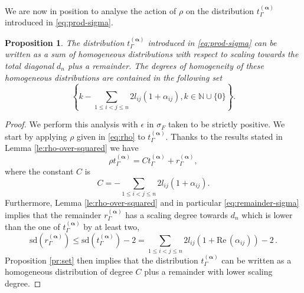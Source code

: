 \documentclass[a4paper,10pt,twoside]{article}
\numberwithin{equation}{section}
\newcounter{and}
\def\Ree{\mathrm{Re}\,}
\def\sd{\mathrm{sd}}
\def\balpha{{\boldsymbol{\alpha}}}
\theoremstyle{plain}
\newtheorem{propo}[theo]{Proposition}
\theoremstyle{definition}
\begin{document}
We are now in position to analyse the action of $\rho$ on the distribution $t_\Gamma^{(\balpha)}$ introduced in \eqref{eq:prod-sigma}.

\begin{propo}\label{pr:almost-homo}
The distribution $t_\Gamma^{(\balpha)}$ introduced in \eqref{eq:prod-sigma} can be written as a sum of homogeneous distributions with respect to scaling towards the total diagonal $d_n$ plus a remainder. The degrees of homogeneity of these homogeneous distributions are contained in the following set
\[
\left\{k-\sum_{1\leq i<j\leq n} 2 l_{ij}(1+ \alpha_{ij}), k\in \mathbb{N}\cup \{0\} \right\}.
\] 
\end{propo}

\begin{proof}
We perform this analysis with $\epsilon$ in $\sigma_F$ taken to be strictly positive. We start by applying $\rho$ given in \eqref{eq:rho} to $t_\Gamma^{(\balpha)}$. Thanks to the results stated in Lemma \ref{le:rho-over-squared} we have
\[
\rho t_\Gamma^{(\balpha)}  =    C   t_\Gamma^{(\balpha)}    + r^{(\balpha)}_\Gamma,
\]
where the constant $C$ is
\[
C= -\sum_{1\leq i<j\leq n} 2 l_{ij}(1+ \alpha_{ij}).
\]
Furthermore, Lemma \ref{le:rho-over-squared} and in particular \eqref{eq:remainder-sigma} implies that the remainder $r^{(\balpha)}_\Gamma$ has a scaling degree towards $d_n$ which is lower than the one of $t_\Gamma^{(\balpha)}$ by at least two, 
\begin{equation}\label{eq:sd-tgamma}
\sd(r^{(\balpha)}_\Gamma) \leq \sd(t_\Gamma^{(\balpha)})-2 = \sum_{1\leq i<j\leq n} 2 l_{ij}(1+ \Ree(\alpha_{ij})) -2\,.
\end{equation}
Proposition \ref{pr:set} then implies that the distribution $t_\Gamma^{(\balpha)}$ can be written as a homogeneous distribution of degree $C$  
plus a remainder with lower scaling degree.


\end{proof}
\end{document}
